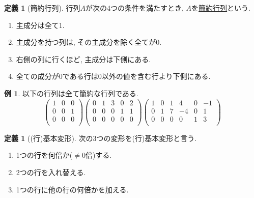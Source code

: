 \documentclass[dvipdfmx,a4paper,11pt]{article}
\theoremstyle{definition}
\newtheorem{dfn}[thm]{定義}
\newtheorem{exa}[thm]{例}
\begin{document}
 
\begin{tcolorbox}[
    colback = white,
    colframe = green!35!black,
    fonttitle = \bfseries,
    breakable = true]
    \begin{dfn}[簡約行列]
  行列$A$が次の4つの条件を満たすとき, $A$を\underline{簡約行列}という.
  \begin{enumerate}
  	\setlength{\parskip}{0cm}
  	\setlength{\itemsep}{0pt} 
\item 主成分は全て1.
\item 主成分を持つ列は, その主成分を除く全てが0.
\item 右側の列に行くほど, 主成分は下側にある.
\item 全ての成分が0である行は0以外の値を含む行より下側にある. 
  \end{enumerate}
  \end{dfn}
 \end{tcolorbox}
 \begin{exa}
以下の行列は全て簡約な行列である.
$$
\begin{pmatrix}
 1& 0& 0 \\
 0& 0& 1 \\
 0& 0& 0 \\
 \end{pmatrix}
 \begin{pmatrix}
 0& 1& 3  & 0&2\\
 0& 0& 0  & 1&1\\
 0& 0& 0 & 0&0\\
 \end{pmatrix}
  \begin{pmatrix}
 1& 0& 1  & 4&0&-1\\
 0& 1& 7 & -4&0&1\\
 0& 0& 0 & 0&1&3\\
 \end{pmatrix}
$$
\end{exa}

\begin{tcolorbox}[
    colback = white,
    colframe = green!35!black,
    fonttitle = \bfseries,
    breakable = true]
    \begin{dfn}[(行)基本変形]
 次の3つの変形を(行)基本変形と言う. 
 \begin{enumerate}
   	\setlength{\parskip}{0cm}
  	\setlength{\itemsep}{0pt} 
 \item 1つの行を何倍か($\neq 0$倍)する.
 \item 2つの行を入れ替える.
 \item 1つの行に他の行の何倍かを加える.
 \end{enumerate}
 \end{dfn}
 \end{tcolorbox}
 
\end{document}
